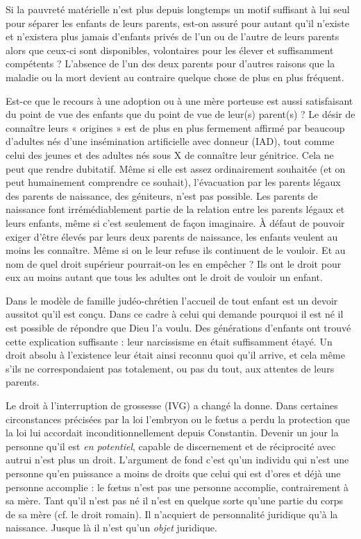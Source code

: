  Si la pauvreté matérielle n'est plus depuis longtemps un motif suffisant à lui seul pour séparer les enfants de leurs parents, est-on assuré pour autant qu'il n'existe et n'existera plus jamais d'enfants privés de l'un ou de l'autre de leurs parents alors que ceux-ci sont disponibles, volontaires pour les élever et suffisamment compétents ? L'absence de l'un des deux parents pour d'autres raisons que la maladie ou la mort devient au contraire quelque chose de plus en plus fréquent. 


 Est-ce que le recours à une adoption ou à une mère porteuse est aussi satisfaisant du point de vue des enfants que du point de vue de leur(s) parent(s) ? Le désir de connaître leurs « origines » est de plus en plus fermement affirmé par beaucoup d'adultes nés d'une insémination artificielle avec donneur (IAD), tout comme celui des jeunes et des adultes nés sous X de connaître leur génitrice. Cela ne peut que rendre dubitatif. Même si elle est assez ordinairement souhaitée (et on peut humainement comprendre ce souhait), l'évacuation par les parents légaux des parents de naissance, des géniteurs, n'est pas possible. Les parents de naissance font irrémédiablement partie de la relation entre les parents légaux et leurs enfants, même si c'est seulement de façon imaginaire. À défaut de pouvoir exiger d'être élevés par leurs deux parents de naissance, les enfants veulent au moins les connaître. Même si on le leur refuse ils continuent de le vouloir. Et au nom de quel droit supérieur pourrait-on les en empêcher ? Ils ont le droit pour eux au moins autant que tous les adultes ont le droit de vouloir un enfant. 
 
 Dans le modèle de famille judéo-chrétien  l'accueil de tout enfant est un devoir aussitot qu'il est conçu. Dans ce cadre à celui qui demande pourquoi il est né il est possible de répondre que Dieu l'a voulu. Des générations d'enfants ont trouvé cette explication suffisante : leur narcissisme en était suffisamment étayé. Un droit absolu à l'existence leur était ainsi reconnu quoi qu'il arrive, et cela même s'ils ne correspondaient pas totalement, ou pas du tout, aux attentes de leurs parents.
  
 Le droit à l'interruption de grossesse (IVG) a changé la donne. Dans certaines circonstances précisées par la loi l'embryon ou le fœtus a perdu la protection que la loi lui accordait inconditionnellement depuis Constantin. Devenir un jour la personne qu'il est \emph{en potentiel}, capable de discernement et de réciprocité avec autrui  n'est plus un droit. L'argument de fond c'est qu'un individu qui n'est une personne qu'en puissance a moins de droits que celui qui est d'ores et déjà une personne accomplie : le fœtus n'est pas une personne accomplie, contrairement à sa mère. Tant qu'il n'est pas né il n'est en quelque sorte qu'une partie du corps de sa mère (cf. le droit romain). Il n'acquiert de personnalité juridique qu'à la naissance. Jusque là il n'est qu'un \emph{objet} juridique. 

